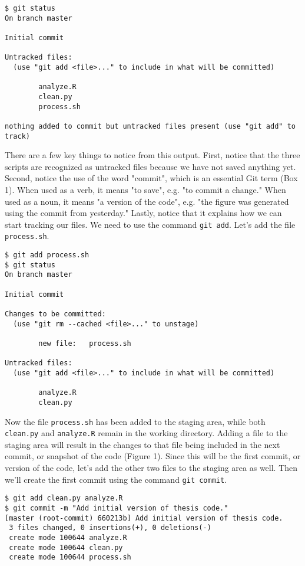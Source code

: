 \begin{lstlisting}
$ git status
On branch master

Initial commit

Untracked files:
  (use "git add <file>..." to include in what will be committed)

        analyze.R
        clean.py
        process.sh

nothing added to commit but untracked files present (use "git add" to track)
\end{lstlisting}

There are a few key things to notice from this output.
First, notice that the three scripts are recognized as untracked files because we have not saved anything yet.
Second, notice the use of the word "commit", which is an essential Git term (Box 1).
When used as a verb, it means "to save", e.g. "to commit a change."
When used as a noun, it means "a version of the code", e.g. "the figure was generated using the commit from yesterday."
Lastly, notice that it explains how we can start tracking our files.
We need to use the command \verb|git add|.
Let's add the file \verb|process.sh|.

\begin{lstlisting}
$ git add process.sh
$ git status
On branch master

Initial commit

Changes to be committed:
  (use "git rm --cached <file>..." to unstage)

        new file:   process.sh

Untracked files:
  (use "git add <file>..." to include in what will be committed)

        analyze.R
        clean.py
\end{lstlisting}

Now the file \verb|process.sh| has been added to the staging area, while both \verb|clean.py| and \verb|analyze.R| remain in the working directory.
Adding a file to the staging area will result in the changes to that file being included in the next commit, or snapshot of the code (Figure 1).
Since this will be the first commit, or version of the code, let's add the other two files to the staging area as well.
Then we'll create the first commit using the command \verb|git commit|.

\begin{lstlisting}
$ git add clean.py analyze.R
$ git commit -m "Add initial version of thesis code."
[master (root-commit) 660213b] Add initial version of thesis code.
 3 files changed, 0 insertions(+), 0 deletions(-)
 create mode 100644 analyze.R
 create mode 100644 clean.py
 create mode 100644 process.sh
\end{lstlisting}

